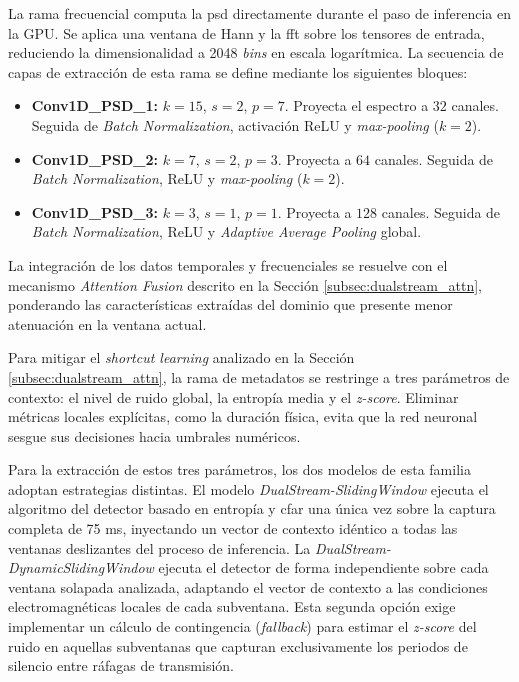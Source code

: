 La rama frecuencial computa la \gls{psd} directamente durante el paso de inferencia en la GPU. Se aplica una ventana de Hann y la \gls{fft} sobre los tensores de entrada, reduciendo la dimensionalidad a 2048 \textit{bins} en escala logarítmica. La secuencia de capas de extracción de esta rama se define mediante los siguientes bloques:
\begin{itemize}
    \item \textbf{Conv1D\_PSD\_1:} $k=15$, $s=2$, $p=7$. Proyecta el espectro a $32$ canales. Seguida de \textit{Batch Normalization}, activación ReLU y \textit{max-pooling} ($k=2$).
    \item \textbf{Conv1D\_PSD\_2:} $k=7$, $s=2$, $p=3$. Proyecta a $64$ canales. Seguida de \textit{Batch Normalization}, ReLU y \textit{max-pooling} ($k=2$).
    \item \textbf{Conv1D\_PSD\_3:} $k=3$, $s=1$, $p=1$. Proyecta a $128$ canales. Seguida de \textit{Batch Normalization}, ReLU y \textit{Adaptive Average Pooling} global.
\end{itemize}
La integración de los datos temporales y frecuenciales se resuelve con el mecanismo \textit{Attention Fusion} descrito en la Sección \ref{subsec:dualstream_attn}, ponderando las características extraídas del dominio que presente menor atenuación en la ventana actual.

Para mitigar el \textit{shortcut learning} analizado en la Sección \ref{subsec:dualstream_attn}, la rama de metadatos se restringe a tres parámetros de contexto: el nivel de ruido global, la entropía media y el \textit{z-score}. Eliminar métricas locales explícitas, como la duración física, evita que la red neuronal sesgue sus decisiones hacia umbrales numéricos. 

Para la extracción de estos tres parámetros, los dos modelos de esta familia adoptan estrategias distintas. El modelo \textit{DualStream-SlidingWindow} ejecuta el algoritmo del detector basado en entropía y \gls{cfar} una única vez sobre la captura completa de 75 ms, inyectando un vector de contexto idéntico a todas las ventanas deslizantes del proceso de inferencia. La \textit{DualStream-DynamicSlidingWindow} ejecuta el detector de forma independiente sobre cada ventana solapada analizada, adaptando el vector de contexto a las condiciones electromagnéticas locales de cada subventana. Esta segunda opción exige implementar un cálculo de contingencia (\textit{fallback}) para estimar el \textit{z-score} del ruido en aquellas subventanas que capturan exclusivamente los periodos de silencio entre ráfagas de transmisión.

